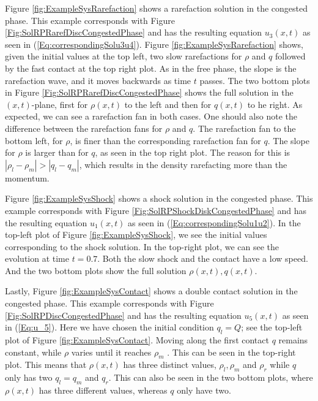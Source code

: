 \documentclass[10pt]{article}
\numberwithin{equation}{section}
\begin{document}
\begin{figure}
\end{figure}Figure \ref{fig:ExampleSysRarefaction} shows a rarefaction solution in the congested phase. This example corresponds with Figure \ref{Fig:SolRPRarefDiscCongestedPhase} and has the resulting equation $u_3(x,t)$ as seen in (\ref{Eq:correspondingSolu3u4}). Figure \ref{fig:ExampleSysRarefaction} shows, given the initial values at the top left, two slow rarefactions for $\rho$ and $q$ followed by the fast contact at the top right plot. As in the free phase, the slope is the rarefaction wave, and it moves backwards as time $t$ passes.  The two bottom plots in Figure \ref{Fig:SolRPRarefDiscCongestedPhase} shows the full solution in the $(x,t)$-plane, first for $\rho(x,t)$ to the left and then for $q(x,t)$ to he right. As expected, we can see a rarefaction fan in both cases. One should also note the difference between the rarefaction fans for $\rho$ and $q$. The rarefaction fan to the bottom left, for $\rho$, is finer than the corresponding rarefaction fan for $q$. The slope for $\rho$ is larger than for $q$, as seen in the top right plot. The reason for this is $|\rho_l - \rho_m| > |q_l - q_m|$, which results in the density rarefacting more than the momentum. 

Figure \ref{fig:ExampleSysShock} shows a shock solution in the congested phase. This example corresponds with Figure \ref{Fig:SolRPShockDiskCongestedPhase} and has the resulting equation $u_1(x,t)$ as seen in (\ref{Eq:correspondingSolu1u2}). In the top-left plot of Figure \ref{fig:ExampleSysShock}, we see the initial values corresponding to the shock solution. In the top-right plot, we can see the evolution at time $t = 0.7$. Both the slow shock and the contact have a low speed. And the two bottom plots show the full solution $\rho(x,t), q(x,t)$.

Lastly, Figure \ref{fig:ExampleSysContact} shows a double contact solution in the congested phase. This example corresponds with Figure \ref{Fig:SolRPDiscCongestedPhase} and has the resulting equation $u_5(x,t)$ as seen in (\ref{Eq:u_5}). Here we have chosen the initial condition $q_l = Q$; see the top-left plot of Figure \ref{fig:ExampleSysContact}. Moving along the first contact $q$ remains constant, while $\rho$ varies until it reaches $\rho_m$ . This can be seen in the top-right plot. This means that $\rho(x,t)$ has three distinct values, $\rho_l, \rho_m $ and $\rho_r$ while $q$ only has two $q_l = q_m$ and $q_r$. This can also be seen in the two bottom plots, where $\rho(x,t)$ has three different values, whereas $q $ only have two. 
\end{document}

